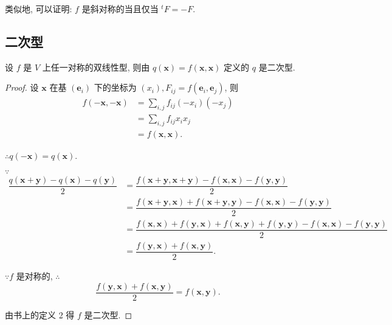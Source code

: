 \documentclass{ctexart}
\begin{document}
类似地, 可以证明: $f$ 是斜对称的当且仅当 $^tF=-F$.
\subsection{二次型}
\begin{theorem}
    设 $f$ 是 $V$ 上任一对称的双线性型, 则由 $q(\boldsymbol{x})=f(\boldsymbol{x},\boldsymbol{x})$ 定义的 $q$ 是二次型.
\end{theorem}
\begin{proof}
    设 $\boldsymbol{x}$ 在基 $(\boldsymbol{e}_i)$ 下的坐标为 $(x_i),F_{ij}=f(\boldsymbol{e}_i,\boldsymbol{e}_j)$, 则
    \begin{align*}
        f(-\boldsymbol{x},-\boldsymbol{x}) & =\sum\limits_{i,j}f_{ij}(-x_i)(-x_j) \\
        & =\sum\limits_{i,j}f_{ij}x_ix_j \\
        & =f(\boldsymbol{x},\boldsymbol{x}).
    \end{align*}
   
    $\therefore q(-\boldsymbol{x})=q(\boldsymbol{x})$.

    $\because$
    \begin{align*}
        \dfrac{q(\boldsymbol{x}+\boldsymbol{y})-q(\boldsymbol{x})-q(\boldsymbol{y})}{2} & =\dfrac{f(\boldsymbol{x}+\boldsymbol{y},\boldsymbol{x}+\boldsymbol{y})-f(\boldsymbol{x},\boldsymbol{x})-f(\boldsymbol{y},\boldsymbol{y})}{2} \\
        & =\dfrac{f(\boldsymbol{x}+\boldsymbol{y},\boldsymbol{x})+f(\boldsymbol{x}+\boldsymbol{y},\boldsymbol{y})-f(\boldsymbol{x},\boldsymbol{x})-f(\boldsymbol{y},\boldsymbol{y})}{2} \\
        & =\dfrac{f(\boldsymbol{x},\boldsymbol{x})+f(\boldsymbol{y},\boldsymbol{x})+f(\boldsymbol{x},\boldsymbol{y})+f(\boldsymbol{y},\boldsymbol{y})-f(\boldsymbol{x},\boldsymbol{x})-f(\boldsymbol{y},\boldsymbol{y})}{2} \\
        & =\dfrac{f(\boldsymbol{y},\boldsymbol{x})+f(\boldsymbol{x},\boldsymbol{y})}{2}.
    \end{align*}

    $\because f$ 是对称的, $\therefore$
    \[\dfrac{f(\boldsymbol{y},\boldsymbol{x})+f(\boldsymbol{x},\boldsymbol{y})}{2}=f(\boldsymbol{x},\boldsymbol{y}).\]

    由书上的定义 2 得 $f$ 是二次型.
\end{proof}
\end{document}
